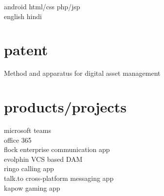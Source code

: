 \begin{minipage}[t]{0.32\textwidth}
android \textbullet{} html/css \textbullet{} php/jsp \\
english \textbullet{} hindi\\ 

\sectionspace %


\section{patent}
\location{}
Method and apparatus for digital asset management \href{https://patents.google.com/patent/US8868506B1/en?inventor=Kunjan+Aggarwal}{\faChain}
\sectionspace %


\section{products/projects}
microsoft teams \href{https://www.microsoft.com/en-ca/microsoft-teams/group-chat-software}{\faChain} \\
office 365 \href{https://www.office.com/}{\faChain} \\
flock enterprise communication app \href{https://flock.com}{\faChain} \\
evolphin VCS based DAM \href{https://evolphin.com/}{\faChain} \\
ringo calling app \href{https://www.ringo.co/}{\faChain}\\
talk.to cross-platform messaging app \\
kapow gaming app \\

\end{minipage} %
\hspace{.01\textwidth}
%
%

